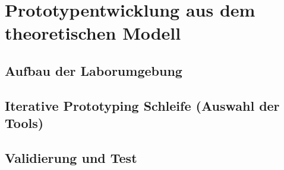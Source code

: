 \newpage
\section{Prototypentwicklung aus dem theoretischen Modell}
\subsection{Aufbau der Laborumgebung}
\subsection{Iterative Prototyping Schleife (Auswahl der Tools)}
\subsection{Validierung und Test}
